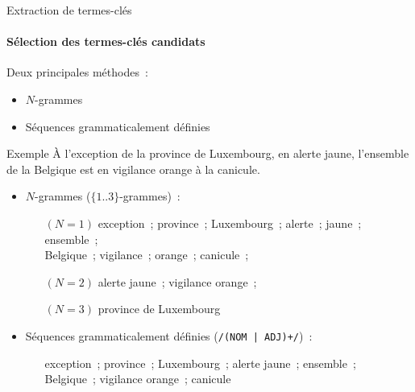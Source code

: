   \begin{frame}{Extraction de termes-clés}\framesubtitle{Sélection des termes-clés candidats}
    Deux principales méthodes~:
    \begin{itemize}
      \item{$N$-grammes}
      \item{Séquences grammaticalement définies}
    \end{itemize}

    \begin{exampleblock}{Exemple}\justifying
      \og{}À l'exception de la province de Luxembourg, en alerte jaune,
      l'ensemble de la Belgique est en vigilance orange à la canicule.\fg{}

      \vspace{1em}

      \begin{itemize}
        \item{$N$-grammes ($\{1..3\}$-grammes)~:}
        \begin{itemize}\setlength{\itemindent}{.6cm}
          \item[$(N = 1)$]{
            exception~; province~; Luxembourg~; alerte~; jaune~; ensemble~;\\
            \hspace{.6cm}Belgique~; vigilance~; orange~; canicule~;
          }
          \item[$(N = 2)$]{
            alerte jaune~; vigilance orange~;
          }
          \item[$(N = 3)$]{
            province de Luxembourg
          }
        \end{itemize}
        \item{Séquences grammaticalement définies (\texttt{/(NOM | ADJ)+/})~:}
        \begin{itemize}\setlength{\itemindent}{.6cm}
          \item[]{exception~; province~; Luxembourg~; alerte jaune~;
                ensemble~;\\
                \hspace{.6cm}Belgique~; vigilance orange~; canicule}
        \end{itemize}
      \end{itemize}
    \end{exampleblock}
  \end{frame}

